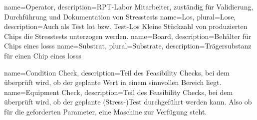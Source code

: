 {
    name=Operator,
    description={RPT-Labor Mitarbeiter, zuständig für Validierung, Durchführung und Dokumentation von Stresstests}
}
{
    name=Los,
    plural=Lose,
    description={Auch als Test lot bzw. Test-Los Kleine Stückzahl von produzierten Chips die Stresstests unterzogen werden.}
}
{
    name=Board,
    description={Behälter für Chips eines \glspl{los}s}
}
{
    name=Substrat,
    plural=Substrate,
    description={Trägersubstanz für einen Chip eines \glspl{los}s}
}

{
    name=Condition Check,
    description={Teil des Feasibility Checks, bei dem überprüft wird, ob der geplante Wert in einem sinnvollen Bereich liegt.}
}
{
    name=Equipment Check,
    description={Teil des Feasibility Checks, bei dem überprüft wird, ob der geplante (Stress-)Test durchgeführt werden kann. Also ob für die geforderten Parameter, eine Maschine zur Verfügung steht.}
}



